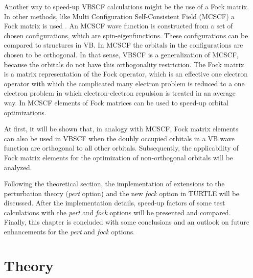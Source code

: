 Another way to speed-up VBSCF calculations might be the use of a Fock matrix. In other methods, like Multi Configuration Self-Consistent Field (MCSCF) \cite{wahldasbook,daswahl} a Fock matrix is used \cite{roos1,roos2}. An MCSCF wave function is constructed from a set of chosen configurations, which are spin-eigenfunctions. These configurations can be compared to structures in VB. In MCSCF the orbitals in the configurations are chosen to be orthogonal. In that sense, VBSCF is a generalization of MCSCF, because the orbitals do not have this orthogonality restriction. The Fock matrix is a matrix representation of the Fock operator, which is an effective one electron operator with which the complicated many electron problem is reduced to a one electron problem in which electron-electron repulsion is treated in an average way. In MCSCF elements of Fock matrices can be used to speed-up orbital optimizations.

At first, it will be shown that, in analogy with MCSCF, Fock matrix elements can also be used in VBSCF when the doubly occupied orbitals in a VB wave function are orthogonal to all other orbitals. Subsequently, the applicability of Fock matrix elements for the optimization of non-orthogonal orbitals will be analyzed. 

Following the theoretical section, the implementation of extensions to the perturbation theory (\textit{pert} option) and the new \textit{fock} option in TURTLE will be discussed. After the implementation details, speed-up factors of some test calculations with the \textit{pert} and \textit{fock} options will be presented and compared. Finally, this chapter is concluded with some conclusions and an outlook on future enhancements for the \textit{pert} and \textit{fock} options.  

\section{Theory}

